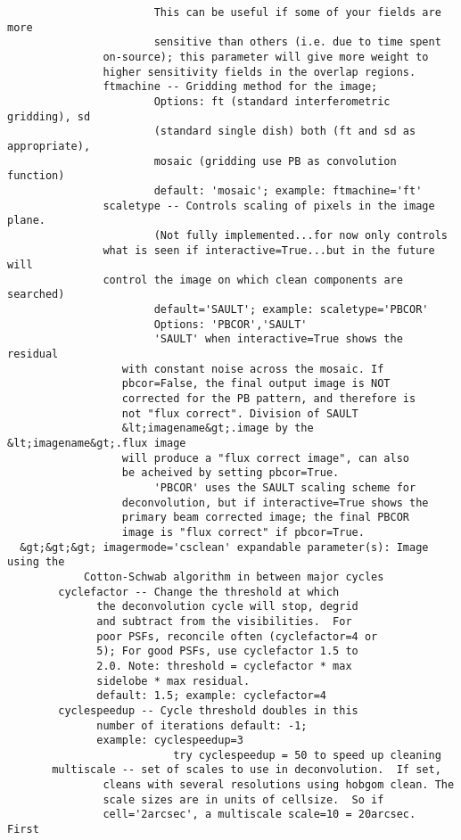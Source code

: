 \begin{verbatim}
                       This can be useful if some of your fields are more
                       sensitive than others (i.e. due to time spent 
 		       on-source); this parameter will give more weight to 
 		       higher sensitivity fields in the overlap regions.
               ftmachine -- Gridding method for the image;
                       Options: ft (standard interferometric gridding), sd
                       (standard single dish) both (ft and sd as appropriate),
                       mosaic (gridding use PB as convolution function)
                       default: 'mosaic'; example: ftmachine='ft'
               scaletype -- Controls scaling of pixels in the image plane.
                       (Not fully implemented...for now only controls 
 		       what is seen if interactive=True...but in the future will 
 		       control the image on which clean components are searched)
                       default='SAULT'; example: scaletype='PBCOR'
                       Options: 'PBCOR','SAULT'
                       'SAULT' when interactive=True shows the residual
 			      with constant noise across the mosaic. If
 			      pbcor=False, the final output image is NOT
 			      corrected for the PB pattern, and therefore is
 			      not "flux correct". Division of SAULT
 			      &lt;imagename&gt;.image by the &lt;imagename&gt;.flux image
 			      will produce a "flux correct image", can also
 			      be acheived by setting pbcor=True.
                       'PBCOR' uses the SAULT scaling scheme for
 			      deconvolution, but if interactive=True shows the
 			      primary beam corrected image; the final PBCOR
 			      image is "flux correct" if pbcor=True.
  &gt;&gt;&gt; imagermode='csclean' expandable parameter(s): Image using the
            Cotton-Schwab algorithm in between major cycles
 	    cyclefactor -- Change the threshold at which
 			  the deconvolution cycle will stop, degrid
 			  and subtract from the visibilities.  For
 			  poor PSFs, reconcile often (cyclefactor=4 or
 			  5); For good PSFs, use cyclefactor 1.5 to
 			  2.0. Note: threshold = cyclefactor * max
 			  sidelobe * max residual.
 			  default: 1.5; example: cyclefactor=4
 	    cyclespeedup -- Cycle threshold doubles in this
 			  number of iterations default: -1;
 			  example: cyclespeedup=3
                          try cyclespeedup = 50 to speed up cleaning 
       multiscale -- set of scales to use in deconvolution.  If set,
               cleans with several resolutions using hobgom clean. The
               scale sizes are in units of cellsize.  So if
               cell='2arcsec', a multiscale scale=10 = 20arcsec.  First

\end{verbatim}
